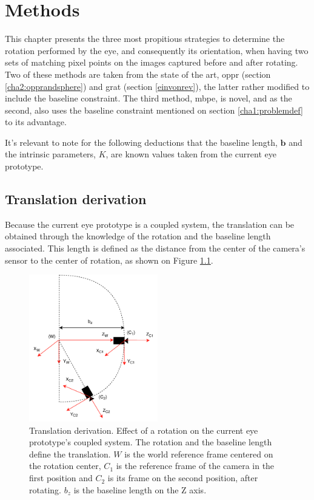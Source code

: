 
\chapter{Methods}
\label{methods}

This chapter presents the three most propitious strategies to determine the rotation performed by the eye, and consequently its orientation, when having two sets of matching pixel points on the images captured before and after rotating. Two of these methods are taken from the state of the art, \acrlong{oppr} (section \ref{cha2:opprandsphere}) and \acrlong{grat} (section \ref{einvonrev}), the latter rather modified to include the baseline constraint. The third method, \acrfull{mbpe}, is novel, and as the second, also uses the baseline constraint mentioned on section \ref{cha1:problemdef} to its advantage.

It's relevant to note for the following deductions that the baseline length, $\mathbf{b}$ and the intrinsic parameters, $K$, are known values taken from the current eye prototype.

\section{Translation derivation}
\label{rignreg}
Because the current eye prototype is a coupled system, the translation can be obtained through the knowledge of the rotation and the baseline length associated. This length is defined as the distance from the center of the camera's sensor to the center of rotation, as shown on Figure \ref{cha3:detori:translation}.
\begin{figure}[ht]
	\centering
	\includegraphics[width=0.5\textwidth]{images/transf.pdf}
	\caption[Translation derivation]{Translation derivation. Effect of a rotation on the current eye prototype's coupled system. The rotation and the baseline length define the translation. ${W}$ is the world reference frame centered on the rotation center, ${C_1}$ is the reference frame of the camera in the first position and ${C_2}$ is its frame on the second position, after rotating. $b_z$ is the baseline length on the Z axis.}
	\label{cha3:detori:translation}
\end{figure}

